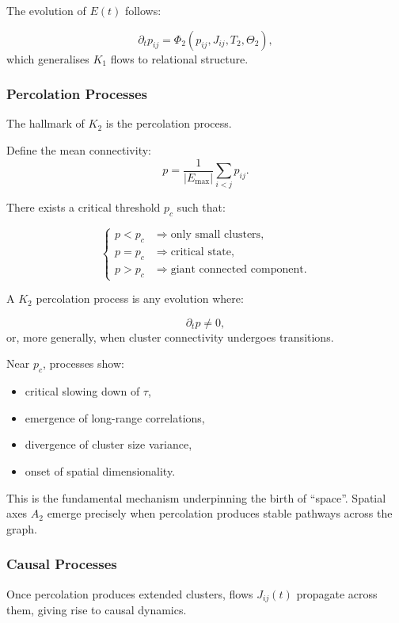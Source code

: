 The evolution of $E(t)$ follows:

\[
\partial_t p_{ij} = \Phi_2(p_{ij}, J_{ij}, T_2, \Theta_2),
\]
which generalises $K_1$ flows to relational structure.

\subsubsection{Percolation Processes}

The hallmark of $K_2$ is the percolation process.

Define the mean connectivity:
\[
p = \frac{1}{|E_{\max}|} \sum_{i<j} p_{ij}.
\]

There exists a critical threshold $p_c$ such that:

\[
\begin{cases}
p < p_c & \Rightarrow \text{only small clusters}, \\
p = p_c & \Rightarrow \text{critical state}, \\
p > p_c & \Rightarrow \text{giant connected component}.
\end{cases}
\]

A $K_2$ percolation process is any evolution where:

\[
\partial_t p \neq 0,
\]
or, more generally, when cluster connectivity undergoes transitions.

Near $p_c$, processes show:

\begin{itemize}
    \item critical slowing down of $\tau$,
    \item emergence of long-range correlations,
    \item divergence of cluster size variance,
    \item onset of spatial dimensionality.
\end{itemize}

This is the fundamental mechanism underpinning the birth of “space”.
Spatial axes $A_2$ emerge precisely when percolation produces stable
pathways across the graph.

\subsubsection{Causal Processes}

Once percolation produces extended clusters, flows $J_{ij}(t)$ propagate
across them, giving rise to causal dynamics.

